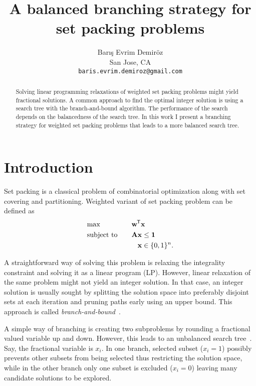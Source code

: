 \documentclass{article}
\title{A balanced branching strategy for set packing problems}
\author{
  Barış Evrim Demiröz \\
  San Jose, CA \\
  \texttt{baris.evrim.demiroz@gmail.com} \\
}
\begin{document}
\maketitle

\begin{abstract}
Solving linear programming relaxations of weighted set packing problems might yield fractional solutions. A common approach to find the optimal integer solution is using a search tree with the branch-and-bound algorithm. The performance of the search depends on the balancedness of the search tree. In this work I present a branching strategy for weighted set packing problems that leads to a more balanced search tree.
\end{abstract}

\newcommand*{\tran}{^{\mkern-1.5mu\mathsf{T}}}
\renewcommand{\vec}[1]{\mathbf{#1}}
\newcommand{\mat}[1]{\mathbf{#1}}
\newtheorem{proposition}{Proposition}



\section{Introduction}
Set packing is a classical problem of combinatorial optimization along with set covering and partitioning. Weighted variant of set packing problem can be defined as
\begin{alignat*}{2}
 & \text{max}    & & \vec{w}\tran \vec{x} \\
 & \text{subject to}  & \quad & \mat{A}\begin{aligned}[t]
                            \vec{x} &\le \vec{1} \\
                           \vec{x} & \in \{0,1\}^n.
                           \end{aligned}
\end{alignat*}

A straightforward way of solving this problem is relaxing the integrality constraint and solving it as a linear program (LP). However, linear relaxation of the same problem might not yield an integer solution. In that case, an integer solution is usually sought by splitting the solution space into preferably disjoint sets at each iteration and pruning paths early using an upper bound. This approach is called \emph{branch-and-bound}~\cite{papadimitriou1998combinatorial}.

A simple way of branching is creating two subproblems by rounding a fractional valued variable up and down. However, this leads to an unbalanced search tree~\cite{vanderbeck2005implementing}. Say, the fractional variable is $x_i$. In one branch, selected subset ($x_i=1$) possibly prevents other subsets from being selected thus restricting the solution space, while in the other branch only one subset is excluded ($x_i=0$) leaving many candidate solutions to be explored.
\end{document}
